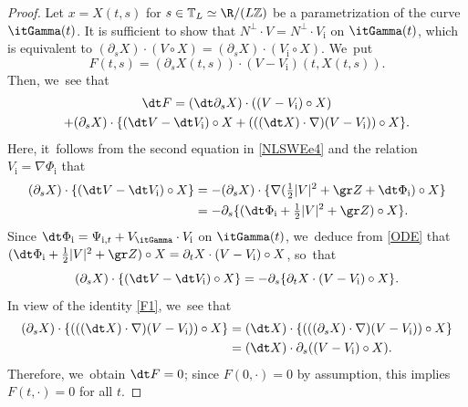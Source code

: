 \begin{proof}
Let $x=X(t,s)$ for $s\in\mathbb{T}_L\simeq\R/(L\mathbb{Z})$ be a parametrization of the curve $\itGamma(t)$.
It is sufficient to show that $N^\perp\cdot V=N^\perp\cdot V_\mathrm{i}$ on $\itGamma(t)$, which is equivalent to
$(\partial_s X)\cdot(V\circ X)=(\partial_s X)\cdot(V_\mathrm{i}\circ X)$. We~put
\[
F(t,s)=(\partial_s X(t,s))\cdot(V-V_\mathrm{i})(t,X(t,s)).
\]
Then, we~see that
\begin{multline*}
\dt F= (\dt\partial_s X)\cdot ((V-V_\mathrm{i})\circ X) \\
+ (\partial_s X)\cdot\{ (\dt V-\dt V_\mathrm{i})\circ X + (((\dt X)\cdot\nabla)(V-V_\mathrm{i}))\circ X \}.
\end{multline*}
Here, it~follows from the second equation in \eqref{NLSWEe4} and the relation $V_\mathrm{i}=\nabla\Phi_\mathrm{i}$ that
\begin{align*}
(\partial_s X)\cdot \{ (\dt V-\dt V_\mathrm{i})\circ X \}
&= - (\partial_s X)\cdot \{ \nabla(\tfrac12|V|^2+\gr Z+\dt\Phi_\mathrm{i})\circ X \} \\
&= - \partial_s \{ (\dt\Phi_\mathrm{i}+\tfrac12|V|^2+\gr Z)\circ X \}.
\end{align*}
Since $\dt \Phi_\mathrm{i}=\Psi_{{\rm i},t}+V_{\itGamma}\cdot V_\mathrm{i}$ on $\itGamma(t)$, we~deduce from \eqref{ODE} that $(\dt\Phi_\mathrm{i}+\tfrac12|V|^2+\gr Z)\circ X=\partial_t X\cdot(V-V_\mathrm{i})\circ X$, so~that
\[
(\partial_s X)\cdot \{ (\dt V-\dt V_\mathrm{i})\circ X \}= - \partial_s \{ \partial_t X\cdot(V-V_\mathrm{i})\circ X\}.
\]
In view of the identity \eqref{F1}, we~see that
\begin{align*}
(\partial_s X)\cdot\{ (((\dt X)\cdot\nabla)(V-V_\mathrm{i}))\circ X \}
&= (\dt X)\cdot\{ (((\partial_s X)\cdot\nabla)(V-V_\mathrm{i}))\circ X \} \\
&= (\dt X)\cdot \partial_s((V-V_\mathrm{i})\circ X).
\end{align*}
Therefore, we~obtain $\dt F=0$; since $F(0,\cdot)=0$ by assumption, this implies $F(t,\cdot)=0$ for all $t$.
\end{proof}

